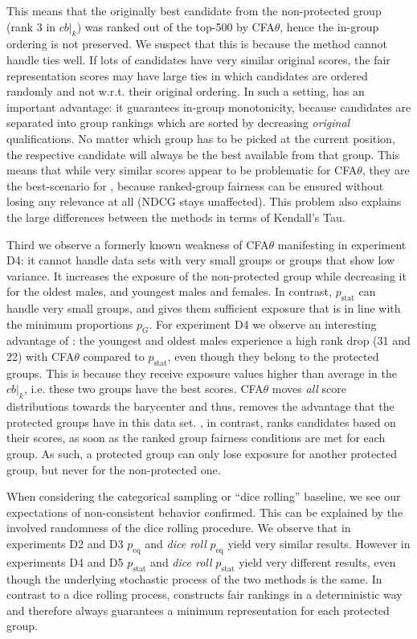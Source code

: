 %
This means that the originally best candidate from the non-protected group (rank 3 in $cb|_k$) was ranked out of the top-500 by CFA$\theta$, hence the in-group ordering is not preserved.
%
We suspect that this is because the method cannot handle ties well.  %
%
If lots of candidates have very similar original scores, the fair representation scores may have large ties in which candidates are ordered randomly and not w.r.t. their original ordering.
%
In such a setting, \algoFAIR has an important advantage: it guarantees in-group monotonicity, because candidates are separated into group rankings which are sorted by decreasing \emph{original} qualifications.
%
No matter which group has to be picked at the current position, the respective candidate will always be the best available from that group.
%
This means that while very similar scores appear to be problematic for CFA$\theta$, they are the best-scenario for \algoFAIR, because ranked-group fairness can be ensured without losing any relevance at all (NDCG stays unaffected).
%
This problem also explains the large differences between the methods in terms of Kendall's Tau.

Third we observe a formerly known weakness of CFA$\theta$ manifesting in experiment D4: it cannot handle data sets with very small groups or groups that show low variance.
%
It increases the exposure of the non-protected group while decreasing it for the oldest males, and youngest males and females.
%
In contrast, \algoFAIR $p_{\text{stat}}$ can handle very small groups, and gives them sufficient exposure that is in line with the minimum proportions $p_G$.
%
For experiment D4 we observe an interesting advantage of \algoFAIR: the youngest and oldest males experience a high rank drop (31 and 22) with CFA$\theta$ compared to \algoFAIR $p_{\text{stat}}$, even though they belong to the protected groups.
%
This is because they receive exposure values higher than average in the $cb|_k$, i.e. these two groups have the best scores.
%
CFA$\theta$ moves \emph{all} score distributions towards the barycenter and thus, removes the advantage that the protected groups have in this data set.
%
\algoFAIR, in contrast, ranks candidates based on their scores, as soon as the ranked group fairness conditions are met for each group.
%
As such, a protected group can only lose exposure for another protected group, but never for the non-protected one.

When considering the categorical sampling or ``dice rolling'' baseline, we see our expectations of non-consistent behavior confirmed.
%
This can be explained by the involved randomness of the dice rolling procedure.
%
We observe that in experiments D2 and D3 \algoFAIR $p_\text{eq}$ and \emph{dice roll} $p_\text{eq}$ yield very similar results.
%
However in experiments D4 and D5 \algoFAIR $p_\text{stat}$ and \emph{dice roll} $p_\text{stat}$ yield very different results, even though the underlying stochastic process of the two methods is the same.
%
In contrast to a dice rolling process, \algoFAIR constructs fair rankings in a deterministic way and therefore always guarantees a minimum representation for each protected group. 

